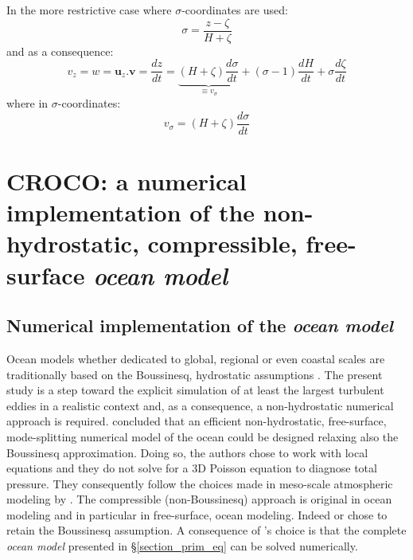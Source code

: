 In the more restrictive case where $\sigma$-coordinates are used:
\begin{equation}
 \displaystyle
 \sigma=\frac{z-\zeta}{H+\zeta}
\end{equation}
and as a consequence:
\begin{equation}
 \displaystyle
 v_z=w=\mathbf{u}_z.\mathbf{v}
=\frac{dz}{dt}=\underbrace{(H+\zeta)\frac{d\sigma}{dt}}_{\equiv v_{\sigma}}
 +(\sigma-1)\frac{dH}{dt}
 +\sigma\frac{d\zeta}{dt}
\end{equation}
where in $\sigma$-coordinates:
\begin{equation}
 \displaystyle
v_{\sigma}=(H+\zeta)\frac{d\sigma}{dt}
\end{equation}

 \section{CROCO: a numerical implementation of the non-hydrostatic, compressible, free-surface \textit{ocean model}}
 \label{section_croco}
 
\subsection{Numerical implementation of the \textit{ocean model}}
Ocean models whether dedicated to global, regional or even coastal scales are traditionally based on the Boussinesq, hydrostatic assumptions \citep{griffies_elements_2012,shchepetkin_regional_2005}. The present study is a step toward the explicit simulation of at least the largest turbulent eddies in a realistic context and, as a consequence, a non-hydrostatic numerical approach is required. \cite{Auclair2018} concluded that an efficient non-hydrostatic, free-surface, mode-splitting numerical model of the ocean could be designed relaxing also the Boussinesq approximation. Doing so, the authors chose to work with local equations and they do not solve for a 3D Poisson equation to diagnose total pressure. They consequently follow the choices made in meso-scale atmospheric modeling by \cite{skamarock_prototypes_2001}. The compressible (non-Boussinesq) approach is original in ocean modeling and in particular in free-surface, ocean modeling. Indeed \cite{marshall_finite-volume_1997} or \cite{auclair_non-hydrostatic_2011} chose to retain the Boussinesq assumption. A consequence of \cite{Auclair2018}'s choice is that the complete \textit{ocean model} presented in \S\ref{section_prim_eq} can be solved numerically.

